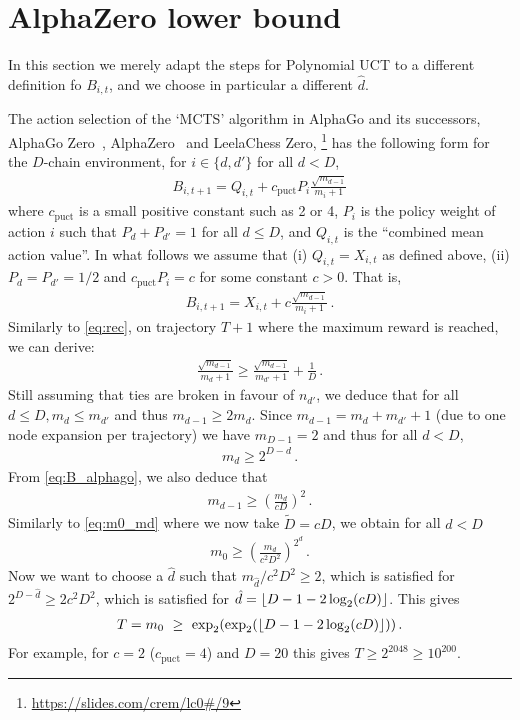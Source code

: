 \documentclass[a4paper]{article}
\begin{document}
\section{AlphaZero lower bound}

In this section we merely adapt the steps for Polynomial UCT
to a different definition fo $B_{i,t}$, and we choose in particular a different
$\hat d$.

The action selection of the `MCTS' algorithm in AlphaGo \citep{silver2016alphago}
and its successors, \eg AlphaGo Zero~\citep{silver2017mastering}, AlphaZero~\citep{silver2017zero} and LeelaChess Zero,
\footnote{\url{https://slides.com/crem/lc0\#/9}}
has the following form for the $D$-chain environment,
for $i\in\{d,d'\}$ for all $d<D$,
\begin{align}
    B_{i, t+1} = Q_{i,t} + c_{\text{puct}}P_i \frac{\sqrt{m_{d-1}}}{m_i+1}
\end{align}
where $c_{\text{puct}}$ is a small positive constant such as 2 or 4,
$P_i$ is the policy weight of action $i$ such that $P_d + P_{d'} = 1$ for all $d\leq D$,
and $Q_{i,t}$ is the ``combined mean action value''.
In what follows we assume that 
(i) $Q_{i,t} = X_{i,t}$ as defined above,
(ii) $P_{d} = P_{d'} = 1/2$ and 
$c_{\text{puct}}P_i = c$ for some constant $c > 0$.
That is,
\begin{align}\label{eq:B_alphago}
    B_{i, t+1} = X_{i,t} + c \frac{\sqrt{m_{d-1}}}{m_i+1}\,.
\end{align}
Similarly to \cref{eq:rec}, on trajectory $T+1$ where the maximum reward is reached, we can derive:
\begin{align}
    \frac{\sqrt{m_{d-1}}}{m_d+1}\geq \frac{\sqrt{m_{d-1}}}{m_{d'}+1} + \frac{1}{D}\,.
\end{align}
Still assuming that ties are broken in favour of $n_{d'}$,
we deduce that for all $d\leq D, m_{d}\leq m_{d'}$ and thus $m_{d-1}\geq 2m_d$.
Since $m_{d-1}  = m_d + m_{d'}+1$
(due to one node expansion per trajectory)
we have $m_{D-1} = 2$ 
and thus for all $d < D$,
\begin{align}
    m_{d} \geq 2^{D-d}\,.
\end{align}
From \cref{eq:B_alphago}, we also deduce that 
\begin{align}
    m_{d-1} \geq \left(\frac{m_d}{cD}\right)^2\,.
\end{align}
Similarly to \cref{eq:m0_md} where we now take $\tilde D = cD$, we obtain for all $d < D$
\begin{align}
    m_0 \geq \left(\frac{m_{d}}{c^2D^2}\right)^{2^{d}}\,.
\end{align}
Now we want to choose a $\hat d$ such that $m_{\hat d} / c^2D^2 \geq 2$,
which is satisfied for $2^{D-\hat d} \geq 2 c^2D^2$, which is satisfied for
$\hat d = \left\lfloor D - 1 - 2\log_2(cD)\right\rfloor$.
This gives
\begin{align}
    T = m_0 ~\geq~ \exp_2(\exp_2(\left\lfloor D - 1 - 2\log_2(cD)\right\rfloor))\,.
\end{align}
For example, for $c=2$ ($c_{\text{puct}}=4$) and $D=20$ this gives $T \geq 2^{2048}\geq 10^{200}$.
\end{document}
